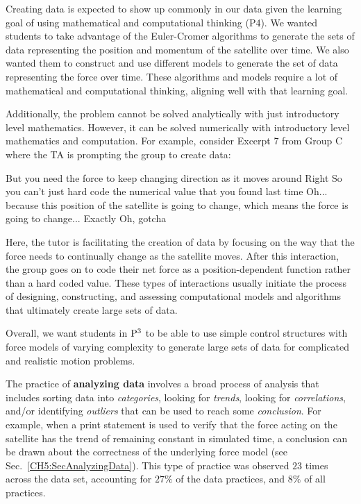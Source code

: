 \documentclass{msuphddissertation}
\begin{document}
\begin{doublespace}
Creating data is expected to show up commonly in our data given the learning goal of using mathematical and computational thinking (P4).  We wanted students to take advantage of the Euler-Cromer algorithms to generate the sets of data representing the position and momentum of the satellite over time.  We also wanted them to construct and use different models to generate the set of data representing the force over time.  These algorithms and models require a lot of mathematical and computational thinking, aligning well with that learning goal.

Additionally, the problem cannot be solved analytically with just introductory level mathematics.  However, it can be solved numerically with introductory level mathematics and computation.  For example, consider Excerpt 7 from Group C where the TA is prompting the group to create data: \begin{description}
\TA But you need the force to keep changing direction as it moves around
\SC Right
\TA So you can't just hard code the numerical value that you found last time
\SC Oh... because this {position of the satellite} is going to change, which means the force is going to change...
\TA Exactly
\SB Oh, gotcha
\end{description}  Here, the tutor is facilitating the creation of data by focusing on the way that the force needs to continually change as the satellite moves.  After this interaction, the group goes on to code their net force as a position-dependent function rather than a hard coded value.  These types of interactions usually initiate the process of designing, constructing, and assessing computational models and algorithms that ultimately create large sets of data.

Overall, we want students in ${\rm P}^{3}$ to be able to use simple control structures with force models of varying complexity to generate large sets of data for complicated and realistic motion problems.

%
%
%

The practice of \textbf{analyzing data} involves a broad process of analysis that includes sorting data into \textit{categories}, looking for \textit{trends}, looking for \textit{correlations}, and/or identifying \textit{outliers} that can be used to reach some \textit{conclusion}.  For example, when a print statement is used to verify that the force acting on the satellite has the trend of remaining constant in simulated time, a conclusion can be drawn about the correctness of the underlying force model (see Sec.~\ref{CH5:SecAnalyzingData}).  This type of practice was observed $23$ times across the data set, accounting for $27\%$ of the data practices, and $8\%$ of all practices.


\end{doublespace}
\end{document}
